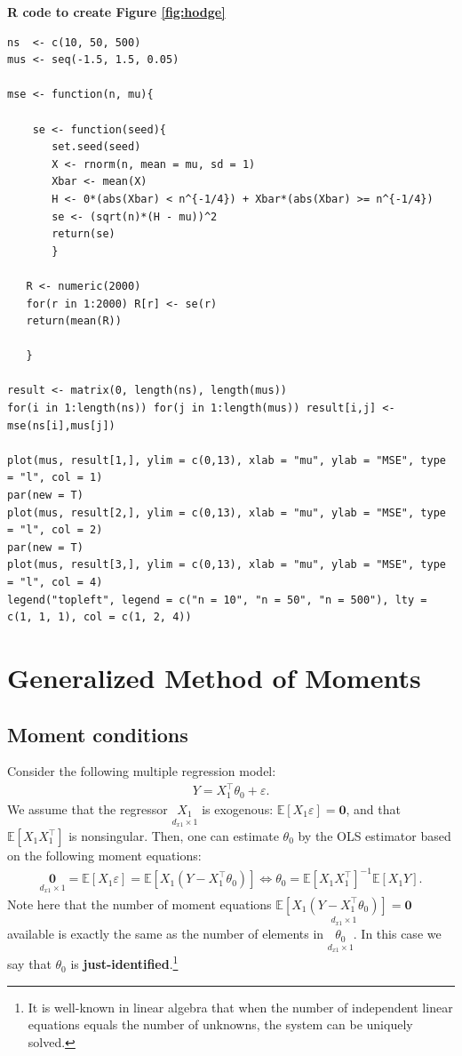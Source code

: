\documentclass[10.5pt, A4paper, openany, uplatex]{book}
\newcommand{\mbf}{\mathbf}
\newcommand{\eps}{\varepsilon}
\newcommand{\E}{\mathbb{E}}
\numberwithin{equation}{section}
\begin{document}
\bigskip

\textbf{R code to create Figure \ref{fig:hodge}}

\bigskip

\begin{lstlisting}[basicstyle=\ttfamily\footnotesize, frame=single]
ns  <- c(10, 50, 500)
mus <- seq(-1.5, 1.5, 0.05)

mse <- function(n, mu){

	se <- function(seed){
	   set.seed(seed)
	   X <- rnorm(n, mean = mu, sd = 1)
	   Xbar <- mean(X)
	   H <- 0*(abs(Xbar) < n^{-1/4}) + Xbar*(abs(Xbar) >= n^{-1/4})
	   se <- (sqrt(n)*(H - mu))^2
	   return(se)
	   }

   R <- numeric(2000)
   for(r in 1:2000) R[r] <- se(r)
   return(mean(R))
	
   }
	
result <- matrix(0, length(ns), length(mus))
for(i in 1:length(ns)) for(j in 1:length(mus)) result[i,j] <- mse(ns[i],mus[j])

plot(mus, result[1,], ylim = c(0,13), xlab = "mu", ylab = "MSE", type = "l", col = 1)
par(new = T)
plot(mus, result[2,], ylim = c(0,13), xlab = "mu", ylab = "MSE", type = "l", col = 2)
par(new = T)
plot(mus, result[3,], ylim = c(0,13), xlab = "mu", ylab = "MSE", type = "l", col = 4)
legend("topleft", legend = c("n = 10", "n = 50", "n = 500"), lty = c(1, 1, 1), col = c(1, 2, 4))
\end{lstlisting}



\chapter{Generalized Method of Moments}\label{chap:gmm}
\section{Moment conditions}\label{sec:mom}

Consider the following multiple regression model:
\begin{align*}
	Y = X_1^\top \theta_0 + \eps.
\end{align*}
We assume that the regressor $\underset{d_{x1} \times 1}{X_1}$ is exogenous: $\E [X_1 \eps] = \mbf{0}$, and that $\E[X_1 X_1^\top]$ is nonsingular.
Then, one can estimate $\theta_0$ by the OLS estimator based on the following moment equations:
\begin{align*}
	\underset{d_{x1} \times 1}{\mbf{0}} = \E[X_1 \eps] = \E[X_1 (Y - X_1^\top\theta_0)]  \iff \theta_0 = \E[X_1 X_1^\top]^{-1} \E[X_1 Y].
\end{align*}
Note here that the number of moment equations $\underset{d_{x1} \times 1}{\E[X_1 (Y - X_1^\top \theta_0)] = \mbf{0}}$ available is exactly the same as the number of elements in $\underset{d_{x1} \times 1}{\theta_0}$.
In this case we say that $\theta_0$ is \textbf{just-identified}.\footnote{
	It is well-known in linear algebra that when the number of independent linear equations equals the number of unknowns, the system can be uniquely solved.
}
\end{document}
